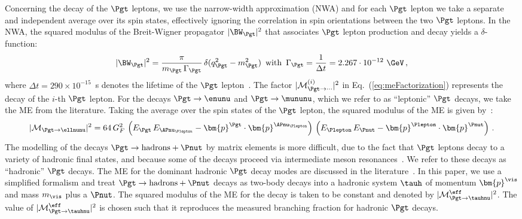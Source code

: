 Concerning the decay of the $\Pgt$ leptons,
we use the narrow-width approximation (NWA) and for each $\Pgt$
lepton we take a separate and independent average over its spin
states, effectively ignoring the correlation in spin orientations between
the two $\Pgt$ leptons.
In the NWA, the squared modulus of the Breit-Wigner propagator $\vert
\BW_{\Pgt} \vert^{2}$ that associates $\Pgt$ lepton production and
decay yields a $\delta$-function:
\begin{equation}
\vert \BW_{\Pgt} \vert^{2} = \frac{\pi}{m_{\Pgt} \, \Gamma_{\Pgt}} \,
\delta ( q_{\Pgt}^{2} - m_{\Pgt}^{2} ) \, \mbox{ with } \, 
\Gamma_{\Pgt} = \frac{1}{\Delta t} =
 2.267 \cdot 10^{-12}\textrm{~\GeV} \, ,
\end{equation}
where $\Delta t = 290 \times 10^{-15}$~s denotes the lifetime of the
$\Pgt$ lepton~\cite{PDG}.
The factor $\vert \mathcal{M}^{(i)}_{\Pgt\to\cdots}
\vert^{2}$ in Eq.~(\ref{eq:meFactorization}) represents the decay of the $i$-th $\Pgt$ lepton.
For the decays $\Pgt \to \enunu$ and $\Pgt
\to \mununu$, which we refer to as ``leptonic'' $\Pgt$ decays, we take the ME from the literature.
Taking the average over the spin states of the $\Pgt$ lepton,
the squared modulus of the ME is given by~\cite{Barger:1987nn}:
\begin{equation}
\vert\mathcal{M}_{\Pgt \to \ellnunu} \vert^{2} = 64 \, G^{2}_{F} \,
\left( E_{\Pgt} \, E_{\APnu_{\Plepton}} - \bm{p}^{\Pgt} \cdot
  \bm{p}^{\APnu_{\Plepton}} \right) \, \left( E_{\Plepton} \,
  E_{\Pnut} - \bm{p}^{\Plepton} \cdot \bm{p}^{\Pnut} \right) \, .
\label{eq:leptonic_tau_decays_ME}
\end{equation}
The modelling of the decays $\Pgt \to \textrm{hadrons} + \Pnut$ 
by matrix elements is more difficult, 
due to the fact that $\Pgt$ leptons decay to a variety of hadronic
final states, and because some of the decays proceed via intermediate 
meson resonances~\cite{PDG}.
We refer to these decays as ``hadronic'' $\Pgt$ decays.
The ME for the dominant hadronic $\Pgt$ decay modes are discussed in the literature~\cite{Bullock:1992yt,Raychaudhuri:1995kv}.
In this paper, we use a simplified formalism and treat $\Pgt \to \textrm{hadrons} + \Pnut$ decays as two-body decays into a hadronic system $\tauh$ of momentum $\bm{p}^{\vis}$ and mass $m_{\vis}$ plus a $\Pnut$.
The squared modulus of the ME for the decay is taken to be constant and denoted by $\vert\mathcal{M}^{\eff}_{\Pgt \to \tauhnu}\vert^{2}$.
The value of $\vert\mathcal{M}^{\eff}_{\Pgt \to \tauhnu}\vert^{2}$ is
chosen such that it reproduces the measured branching fraction for hadronic $\Pgt$ decays.
